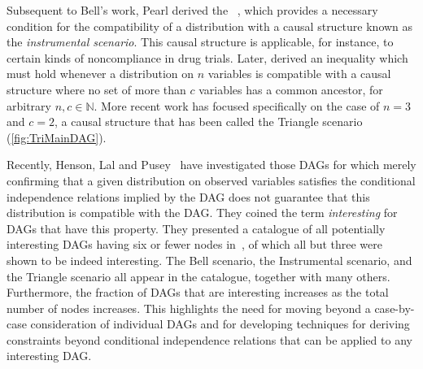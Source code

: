 \documentclass[aps,english,superscriptaddress,onecolumn,twoside,longbibliography,pra,floatfix,fleqn,nofootinbib]{revtex4-1}%
\newcommand*{\tblue}[1]{{\color{MidnightBlue}{\textbf{#1}}}}
\theoremstyle{definition}
\begin{document}
Subsequent to Bell's work, Pearl derived the \tblue{instrumental inequality}~\cite{pearl1995instrumental}, which provides a necessary condition for the compatibility of a distribution with a causal structure 
known as the \emph{instrumental scenario}.  This causal structure is applicable, for instance, to certain kinds of noncompliance in drug trials. Later, \citet{steudel2010ancestors} derived an inequality which must hold whenever a distribution on $n$
variables is compatible with a causal structure where no set of more
than $c$ variables has a common ancestor, for arbitrary $n,c \in \mathbb{N}$. More recent work has focused specifically on the case of $n=3$ and $c=2$, a causal structure that has been called the Triangle scenario~\cite{fritz2012bell,chaves2014novel} (\cref{fig:TriMainDAG}).

Recently, Henson, Lal and Pusey~\cite{pusey2014gdag} have investigated those DAGs for which merely confirming that a given distribution on observed variables satisfies the conditional independence relations implied by the DAG does not guarantee that this distribution is compatible with the DAG.  They coined the term \emph{interesting} for DAGs that have this property. They presented a catalogue of all potentially interesting DAGs having six or fewer nodes in~\cite[App.~E]{pusey2014gdag}, of which all but three were shown to be indeed interesting. The Bell scenario, the Instrumental scenario, and the Triangle scenario all appear in the catalogue, together with many others.   Furthermore, the fraction of DAGs that are interesting increases as the total number of nodes increases.  This highlights the need for moving beyond a case-by-case consideration of individual DAGs and for developing techniques for deriving constraints beyond conditional independence relations that can be applied to any interesting DAG. 
\end{document}
